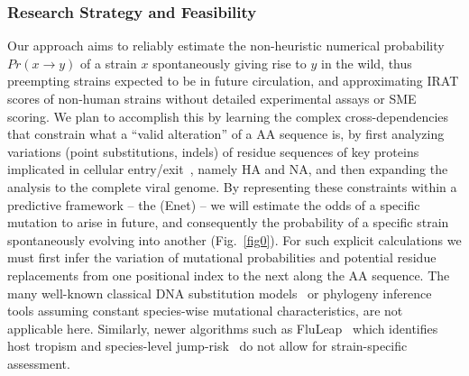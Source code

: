 \documentclass[onecolumn, compsoc,12pt]{IEEEtran}
\begin{document}
\begin{figure}[t]
  \vspace{-15pt}

  \label{fig1}

  \vspace{-20pt}

  
\end{figure}
\subsubsection*{Research Strategy and Feasibility} %

Our approach aims  to reliably   estimate the non-heuristic numerical probability $Pr(x \rightarrow y)$ of a strain $x$ spontaneously giving rise to  $y$ in the wild, thus preempting  strains  expected to be in future circulation, and approximating IRAT scores of non-human strains without detailed  experimental assays or SME scoring. We plan to accomplish this by learning the complex cross-dependencies that constrain what a ``valid alteration'' of a AA sequence is, by first  analyzing  variations (point substitutions, indels) of   residue  sequences  of key proteins implicated  in cellular entry/exit~\cite{gamblin2010influenza,shao2017evolution}, namely HA and NA, and then expanding the analysis to the complete viral genome. By representing these constraints within a predictive framework -- the \enet (Enet) -- we will  estimate the  odds of a specific mutation to arise in future, and consequently the probability of a specific strain spontaneously  evolving into another (Fig.~\ref{fig0}). For such explicit calculations we must first infer the variation of mutational probabilities and  potential residue replacements from one positional index to the next along the AA sequence. The many well-known classical  DNA  substitution models~\cite{posada1998modeltest} or  phylogeny inference tools  assuming constant species-wise mutational characteristics,  are not applicable here. Similarly, newer algorithms such  as FluLeap~\cite{eng2014predicting}  which identifies host tropism and  species-level jump-risk~\cite{grange2021ranking} do not allow for strain-specific assessment.
\end{document}
